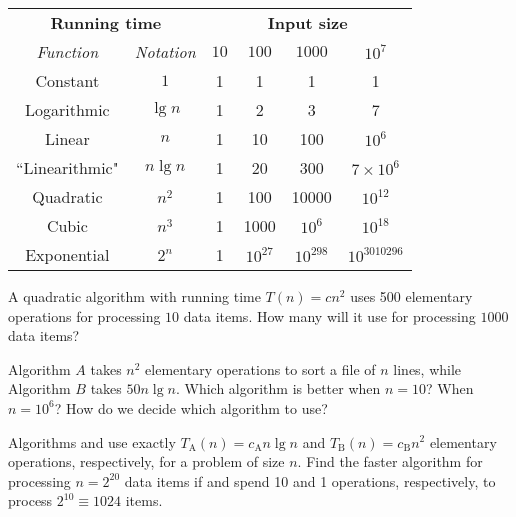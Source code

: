 \begin{center}
   \begin{tabular}{|c|c|cccc|} \hline 
   \multicolumn{2}{|c|}{\textbf{Running time}} &  
   \multicolumn{4}{c|}{\textbf{Input size}} 
\\ \cline{1-6} 
   \emph{Function}     & \emph{Notation} & $10$ & $100$ & $1000$ & $10^7$
\\ \hline 
   Constant     & $1$      & 1  & 1  &   1 &   1 \\ \hline 
   Logarithmic  & $\lg n$ & 1  & 2& 3 & 7  \\ \hline 
   Linear       & $n$ & 1 & 10 & 100 & $10^6$   \\ \hline 
``Linearithmic" & $n  \lg n$ & 1 & 20 & 300 & $7\times 10^6$ \\ \hline 
   Quadratic    & $n^{2}$ & 1 & 100 & 10000 & $10^{12}$ \\ \hline 
   Cubic        & $n^{3}$ & 1 & 1000 & $10^6$ &  $10^{18}$ \\ \hline 
   Exponential  & $2^{n}$ & 1 & $10^{27}$ & $10^{298} $ & $10^{3010296}$  \\ \hline 
   \end{tabular}
\end{center}
 

\begin{Boxample}[7]
\label{exr:time-compl:2}
A quadratic algorithm with running time \(T(n)=cn^2 \)
uses 500 elementary operations for processing $10$ data items. How many will it 
use for processing $1000$ data items? 
\end{Boxample}

\begin{Boxample}[7]
Algorithm $A$ takes $n^2$ elementary operations to sort a file of $n$ lines, while Algorithm $B$ takes $50n\lg n$. 
Which algorithm is better when $n = 10$? When $n=10^6$? How do we decide which algorithm to use?
\end{Boxample}

\begin{Boxample}[7]
\label{exr:time-compl:7A}
Algorithms  and  use exactly $T_\mathrm{A}(n) = c_\mathrm{A} n \lg n$
and $T_\mathrm{B}(n) = c_\mathrm{B} n^{2}$ elementary operations, respectively, for a problem of size $n$.
Find the faster algorithm for processing $n = 2^{20}$ data items if
 and  spend 10 and 1 operations, respectively, to process $2^{10} \equiv 1024$ items.
\end{Boxample}



